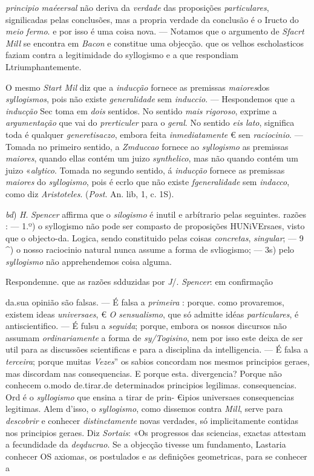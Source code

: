 \emph{principio maéeersal} não deriva da \emph{verdade} das proposições \emph{particulares}, signilicadas pelas conclusões, mas a propria verdade da conclusão é o Iructo do \emph{meio fermo}. e por isso é uma coisa nova. --- Notamos que o argumento de \emph{Sfacrt Mill} se encontra em \emph{Bacon} e constitue uma objecção. que os velhos escholasticos faziam contra a legitimidade do syllogismo e a que respondiam Ltriumphantemente.\par O mesmo \emph{Start Mil} diz que a \emph{inducção} fornece as premissas \emph{maiores}dos \emph{syllogismos}, pois não existe \emph{generalidade} sem \emph{induccio}. --- Hespondemos que a \emph{inducção} Sec toma em \emph{dois} sentidos. No sentido \emph{mais rigoroso}, exprime a \emph{argumentação} que vai do \emph{prerticuler} para o \emph{geral}. No sentido \emph{eis lato}, significa toda é qualquer \emph{generetisaczo}, embora feita \emph{inmediatamente} € sen \emph{raciocinio}. --- Tomada no primeiro sentido, a \emph{Zmduccao} fornece ao \emph{syllogismo} as premissas \emph{maiores}, quando ellas contém um juizo \emph{synthelico}, mas não quando contém um juizo «\emph{alytico}. Tomada no segundo sentido, á \emph{inducção} fornece as premissas \emph{maiores} do \emph{syllogismo}, pois é ecrlo que não existe \emph{fgeneralidade} sem \emph{indacco}, como diz \emph{Aristoteles}. (\emph{Post}. An. lib, 1, c. 1S).\par \emph{bd}) \emph{H}. \emph{Spencer} affirma que o \emph{silogismo} é inutil e arbítrario pelas seguintes. razões : --- 1.º) o syllogismo não pode ser compasto de proposições HUNiVErsaes, visto que o objecto-da. Logica, sendo constituido pelas coisas \emph{concretas}, \emph{singular}; --- 9 \textasciicircum{}) o nosso raciocinio natural nunca assume a forma de svliogismo; --- 3s) pelo \emph{syllogismo} não apprehendemos coisa alguma.\par Respondemne. que as razões sdduzidas por \emph{J}/. \emph{Spencer}: em confirmação\par da.sua opinião são falsas. --- É falsa a \emph{primeira} : porque. como provaremos, existem ideas \emph{universaes}, € \emph{O sensualismo}, que só admitte idéas \emph{particulares}, é antiscientifico. --- É fulsu a \emph{seguida}; porque, embora os nossos discursos não assumam \emph{ordinariamente} a forma de \emph{sy/Togisino}, nem por isso este deixa de ser util para as discussões scientificas e para a disciplina da intelligencia. --- É falsa a \emph{terceira}; porque muitas \emph{Vezes}” os sabios concordam nos mesmos principios geraes, mas discordam nas consequencias. E porque esta. divergencia? Porque não conhecem o.modo de.tirar.de determinados principios legilimas. consequencias. Ord é o \emph{syllogismo} que ensina a tirar de prin- €ipios universaes consequencias legitimas. Alem d'isso, o \emph{syllogismo}, como dissemos contra \emph{Mill}, serve para \emph{descobrir} e conhecer \emph{distinctamente} novas verdades, só implicitamente contidas nos principios geraes. Diz \emph{Sortais}: «Os progressos das sciencias, exactas attestam a fecundidade da \emph{deqducrao}. Se a objecção tivesse um fundamento, Lastaria conhecer OS axiomas, os postulados e as definições geometricas, para se conhecer a 
